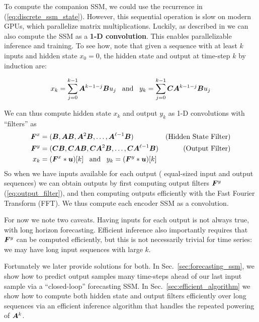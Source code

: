 To compute the companion SSM, we could use the recurrence in (\ref{eq:discrete_ssm_state}). However, this sequential operation is slow on modern GPUs, which parallelize matrix multiplications.
%
Luckily, as described in \cite{gu2021efficiently} we can also compute the SSM as a \textbf{1-D convolution}. This enables parallelizable inference and training. 
To see how, note that given a sequence with at least $k$ inputs and hidden state $x_0 = 0$, the hidden state and output at time-step $k$ by induction are:

\begin{equation}
x_{k} = \sum_{j = 0}^{k - 1}\boldsymbol{A}^{k - 1 - j} \boldsymbol{B} u_j \;\;\;\text{and}\;\;\;
    y_k = \sum_{j = 0}^{k - 1} \boldsymbol{C} \boldsymbol{A}^{k - 1 - j} \boldsymbol{B} u_j 
\label{eq:convolution_view}
\end{equation}

We can thus compute hidden state $x_k$ and output $y_k$ as 1-D convolutions with ``filters'' as
\begin{align}
    \zF^x &= (\zB, \zA \zB, \zA^2 \zB, \ldots, \zA^{\ell - 1} \zB) & (\text{Hidden State Filter}) \label{eq:state_filter}\\
    \zF^y &= (\zC\zB, \zC\zA \zB, \zC\zA^2 \zB, \ldots, \zC\zA^{\ell - 1} \zB) & (\text{Output Filter}) \label{eq:output_filter} \\
\centering
    x_k &= (\zF^x * \zu)[k] \;\;\;\text{and}\;\;\; y_k = (\zF^y * \zu)[k] \label{eq:convolution_output}
\end{align}
So when we have inputs available for each output (\ie{} equal-sized input and output sequences) 
we can obtain outputs by first computing output filters $\boldsymbol{F}^y$ (\ref{eq:output_filter}), and then computing outputs efficiently with the Fast Fourier Transform (FFT). We thus compute each encoder SSM as a convolution.

For now we note two caveats. Having inputs for each output is not always true, \eg{} with long horizon forecasting. Efficient inference also importantly requires that $\boldsymbol{F}^y$ can be computed efficiently, but this is not necessarily trivial for time series: we may have long input sequences with large $k$. 

Fortunately we later provide solutions for both. In Sec.~\ref{sec:forecasting_ssm}, we show how to predict output samples many time-steps ahead of our last input sample via a ``closed-loop'' forecasting SSM. In Sec.~\ref{sec:efficient_algorithm} we show how to compute both hidden state and output filters efficiently over long sequences via an efficient inference algorithm that handles the repeated powering of $\boldsymbol{A}^k$.  


